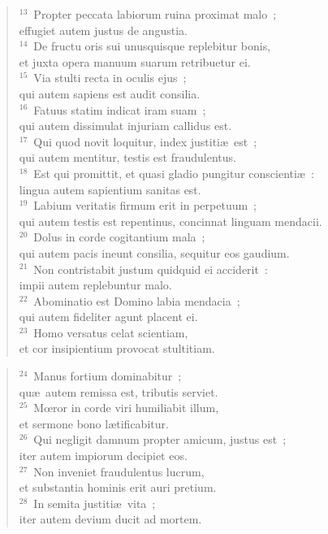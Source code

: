\begin{flushleft}\begin{verse}${}^{13}$~Propter peccata labiorum ruina proximat malo~;\\ effugiet autem justus de angustia.\\
${}^{14}$~De fructu oris sui unusquisque replebitur bonis,\\ et juxta opera manuum suarum retribuetur ei.\\
${}^{15}$~Via stulti recta in oculis ejus~;\\ qui autem sapiens est audit consilia.\\
${}^{16}$~Fatuus statim indicat iram suam~;\\ qui autem dissimulat injuriam callidus est.\\
${}^{17}$~Qui quod novit loquitur, index justiti\ae\ est~;\\ qui autem mentitur, testis est fraudulentus.\\
${}^{18}$~Est qui promittit, et quasi gladio pungitur conscienti\ae~:\\ lingua autem sapientium sanitas est.\\
${}^{19}$~Labium veritatis firmum erit in perpetuum~;\\ qui autem testis est repentinus, concinnat linguam mendacii.\\
${}^{20}$~Dolus in corde cogitantium mala~;\\ qui autem pacis ineunt consilia, sequitur eos gaudium.\\
${}^{21}$~Non contristabit justum quidquid ei acciderit~:\\ impii autem replebuntur malo.\\
${}^{22}$~Abominatio est Domino labia mendacia~;\\ qui autem fideliter agunt placent ei.\\
${}^{23}$~Homo versatus celat scientiam,\\ et cor insipientium provocat stultitiam.\end{verse}\end{flushleft}


\begin{flushleft}\begin{verse}${}^{24}$~Manus fortium dominabitur~;\\ qu\ae\ autem remissa est, tributis serviet.\\
${}^{25}$~Mœror in corde viri humiliabit illum,\\ et sermone bono l\ae tificabitur.\\
${}^{26}$~Qui negligit damnum propter amicum, justus est~;\\ iter autem impiorum decipiet eos.\\
${}^{27}$~Non inveniet fraudulentus lucrum,\\ et substantia hominis erit auri pretium.\\
${}^{28}$~In semita justiti\ae\ vita~;\\ iter autem devium ducit ad mortem.\end{verse}\end{flushleft}


